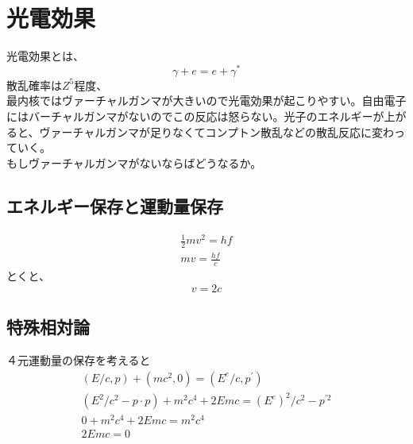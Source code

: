 \documentclass{jsarticle}
\begin{document}
\section{光電効果}
光電効果とは、
\begin{equation}
    \gamma + e = e + \gamma^{*}
\end{equation}
散乱確率は$Z^5$程度、\\
最内核ではヴァーチャルガンマが大きいので光電効果が起こりやすい。自由電子にはバーチャルガンマがないのでこの反応は怒らない。光子のエネルギーが上がると、ヴァーチャルガンマが足りなくてコンプトン散乱などの散乱反応に変わっていく。\\
もしヴァーチャルガンマがないならばどうなるか。
\subsection{エネルギー保存と運動量保存}
\begin{align}
    \frac{1}{2} m v^2 = hf\\
    mv = \frac{hf}{c}
\end{align}
とくと、
\begin{equation}
    v = 2c
\end{equation}

\subsection{特殊相対論}
４元運動量の保存を考えると
\begin{align}
    (E/c, p) + (mc^2, 0) = (E^e /c, p^\prime)\\
    (E^2/c^2 - p \cdot p) + m^2 c^4 + 2 Emc = (E^e)^2 / c^2 - p^{\prime 2}\\
    0 + m^2 c^4 + 2Emc = m^2 c^4 \\
    2Emc = 0
\end{align}
\end{document}

